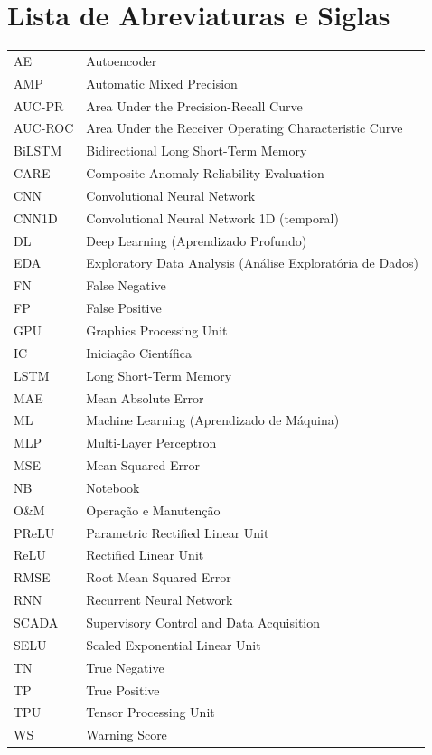 \documentclass[12pt]{article}
\begin{document}
\newpage

\renewcommand{\contentsname}{Sumário}
\tableofcontents
\newpage
\listoffigures
\newpage
\listoftables
\newpage

\section*{Lista de Abreviaturas e Siglas}
\begin{singlespace}
\noindent
\begin{tabular}{ll}
AE       & Autoencoder \\
AMP      & Automatic Mixed Precision \\
AUC-PR   & Area Under the Precision-Recall Curve \\
AUC-ROC  & Area Under the Receiver Operating Characteristic Curve \\
BiLSTM   & Bidirectional Long Short-Term Memory \\
CARE     & Composite Anomaly Reliability Evaluation \\
CNN      & Convolutional Neural Network \\
CNN1D    & Convolutional Neural Network 1D (temporal) \\
DL       & Deep Learning (Aprendizado Profundo) \\
EDA      & Exploratory Data Analysis (Análise Exploratória de Dados) \\
FN       & False Negative \\
FP       & False Positive \\
GPU      & Graphics Processing Unit \\
IC       & Iniciação Científica \\
LSTM     & Long Short-Term Memory \\
MAE      & Mean Absolute Error \\
ML       & Machine Learning (Aprendizado de Máquina) \\
MLP      & Multi-Layer Perceptron \\
MSE      & Mean Squared Error \\
NB       & Notebook \\
O\&M     & Operação e Manutenção \\
PReLU    & Parametric Rectified Linear Unit \\
ReLU     & Rectified Linear Unit \\
RMSE     & Root Mean Squared Error \\
RNN      & Recurrent Neural Network \\
SCADA    & Supervisory Control and Data Acquisition \\
SELU     & Scaled Exponential Linear Unit \\
TN       & True Negative \\
TP       & True Positive \\
TPU      & Tensor Processing Unit \\
WS       & Warning Score \\
\end{tabular}
\end{singlespace}
\newpage
\end{document}
